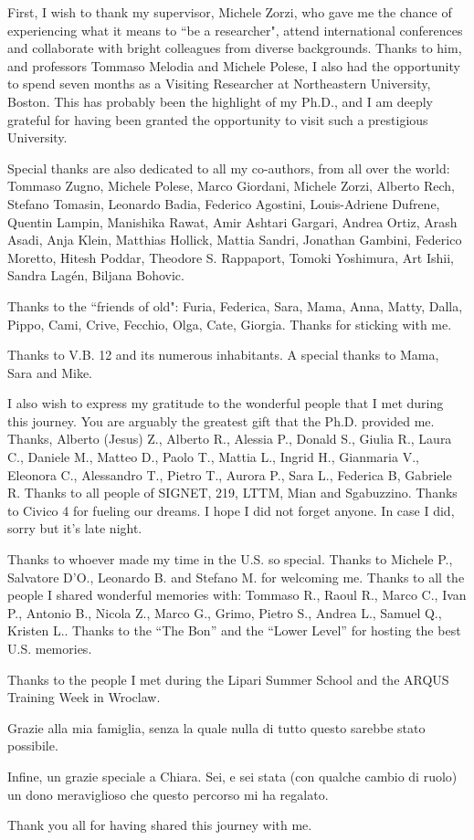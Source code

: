 \small

First, I wish to thank my supervisor, Michele Zorzi, who gave me the chance of experiencing what it means to ``be a researcher", attend international conferences and collaborate with bright colleagues from diverse backgrounds.
Thanks to him, and professors Tommaso Melodia and Michele Polese, I also had the opportunity to spend seven
months as a Visiting Researcher at Northeastern University, Boston. This has probably been the highlight of my Ph.D., and I am deeply grateful for having been granted the opportunity to visit such a prestigious University.

Special thanks are also dedicated to all my co-authors, from all over the world:
Tommaso Zugno, Michele Polese, Marco Giordani, Michele Zorzi,
Alberto Rech, Stefano Tomasin, Leonardo Badia, Federico Agostini, Louis-Adriene Dufrene, Quentin Lampin, Manishika Rawat,
Amir Ashtari Gargari, Andrea Ortiz, Arash Asadi, Anja Klein, Matthias Hollick,
Mattia Sandri,
Jonathan Gambini, Federico Moretto,
Hitesh Poddar, Theodore S. Rappaport, Tomoki Yoshimura, Art Ishii,
Sandra Lagén, Biljana Bohovic.

Thanks to the ``friends of old": Furia, Federica, Sara, Mama, Anna, Matty, Dalla, Pippo, Cami, Crive, Fecchio, Olga, Cate, Giorgia. Thanks for sticking with me.

Thanks to V.B. 12 and its numerous inhabitants. A special thanks to Mama, Sara and Mike.

I also wish to express my gratitude to the wonderful people that I met during this journey.
You are arguably the greatest gift that the Ph.D. provided me. 
Thanks, Alberto (Jesus) Z., Alberto R., Alessia P., Donald S., Giulia R., Laura C., Daniele M., Matteo D., Paolo T., Mattia L., Ingrid H., Gianmaria V., Eleonora C., Alessandro T., Pietro T., Aurora P., Sara L., Federica B, Gabriele R.
Thanks to all people of SIGNET, 219, LTTM, Mian and Sgabuzzino.
Thanks to Civico 4 for fueling our dreams.
I hope I did not forget anyone. In case I did, sorry but it's late night.

Thanks to whoever made my time in the U.S. so special. Thanks to Michele P., Salvatore D'O., Leonardo B. and Stefano M. for welcoming me.
Thanks to all the people I shared wonderful memories with: Tommaso R., Raoul R., Marco C., Ivan P., Antonio B., Nicola Z., Marco G., Grimo, Pietro S., Andrea L., Samuel Q., Kristen L..
Thanks to the ``The Bon'' and the ``Lower Level'' for hosting the best U.S. memories.

Thanks to the people I met during the Lipari Summer School and the ARQUS Training Week in Wroclaw.

Grazie alla mia famiglia, senza la quale nulla di tutto questo sarebbe stato possibile.

Infine, un grazie speciale a Chiara. Sei, e sei stata (con qualche cambio di ruolo) un dono meraviglioso che questo percorso mi ha regalato.

\normalsize
Thank you all for having shared this journey with me.